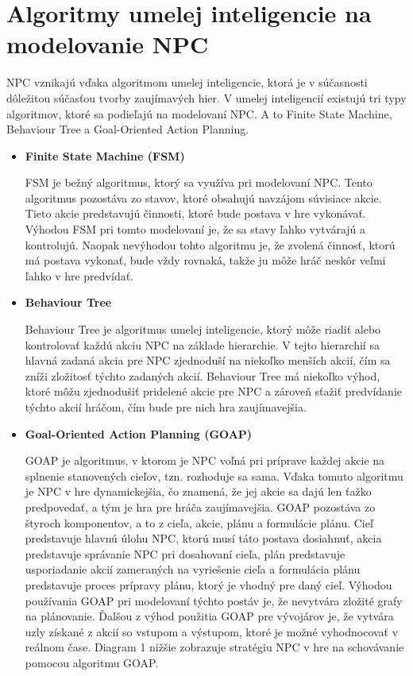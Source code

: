 \documentclass[10pt,twoside,slovak,a4paper]{article}
\begin{document}
\section{Algoritmy umelej inteligencie na modelovanie NPC} 
\quad NPC vznikajú vďaka algoritmom umelej inteligencie, ktorá je v súčasnosti dôležitou súčasťou tvorby zaujímavých hier. V umelej inteligencií existujú tri typy algoritmov, ktoré sa podieľajú na modelovaní NPC. A to Finite State Machine, Behaviour Tree a Goal-Oriented Action Planning.  
\begin{itemize}
\item \textbf{Finite State Machine (FSM)}

\quad FSM je bežný algoritmus, ktorý sa využíva pri modelovaní NPC. Tento algoritmus pozostáva zo stavov, ktoré obsahujú navzájom súvisiace akcie. Tieto akcie predstavujú činnosti, ktoré bude postava v hre vykonávať. Výhodou FSM pri tomto modelovaní je, že sa stavy ľahko vytvárajú a kontrolujú. Naopak nevýhodou tohto algoritmu je, že zvolená činnosť, ktorú má postava vykonať, bude vždy rovnaká, takže ju môže hráč neskôr veľmi ľahko v hre predvídať. \cite{NPC}


\item \textbf{Behaviour Tree}

\quad Behaviour Tree je algoritmus umelej inteligencie, ktorý môže riadiť alebo kontrolovať každú akciu NPC na základe hierarchie. V tejto hierarchií sa hlavná zadaná akcia pre NPC zjednoduší na niekoľko menších akcií, čím sa zníži zložitosť týchto zadaných akcií. Behaviour Tree má niekoľko výhod, ktoré môžu zjednodušiť pridelené akcie pre NPC a zároveň sťažiť predvídanie týchto akcií hráčom, čím bude pre nich hra zaujímavejšia.   \cite{NPC}

\item \textbf{Goal-Oriented Action Planning (GOAP)}

\quad GOAP je algoritmus, v ktorom je NPC voľná pri príprave každej akcie na splnenie stanovených cieľov, tzn. rozhoduje sa sama. Vďaka tomuto algoritmu je NPC v hre dynamickejšia, čo znamená, že jej akcie sa dajú len ťažko predpovedať, a tým je hra pre hráča zaujímavejšia. GOAP pozostáva zo štyroch komponentov, a to z cieľa, akcie, plánu a formulácie plánu. Cieľ predstavuje hlavnú úlohu NPC, ktorú musí táto postava dosiahnuť, akcia predstavuje správanie NPC pri dosahovaní cieľa, plán predstavuje usporiadanie akcií zameraných na vyriešenie cieľa a formulácia plánu predstavuje proces prípravy plánu, ktorý je vhodný pre daný cieľ.  Výhodou používania GOAP pri modelovaní týchto postáv je, že nevytvára zložité grafy na plánovanie. Ďalšou z výhod použitia GOAP pre vývojárov je, že vytvára uzly získané z akcií so vstupom a výstupom, ktoré je možné vyhodnocovať v reálnom čase. Diagram 1 nižšie zobrazuje stratégiu NPC v hre na schovávanie pomocou algoritmu GOAP.  \cite{NPC}

\end{itemize}
\end{document}
